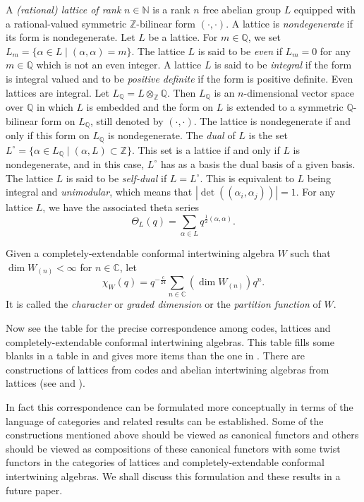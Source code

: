 \documentclass{amsproc}
\theoremstyle{definition}
\theoremstyle{remark}
\numberwithin{equation}{section}
\begin{document}
A {\it (rational) lattice of rank} $n\in \mathbb{N}$ is a rank $n$
free abelian group $L$ equipped with a rational-valued symmetric
$\mathbb{Z}$-bilinear form $(\cdot, \cdot)$. A lattice is {\it
nondegenerate} if its form is nondegenerate. 
Let $L$ be a lattice.  For $m\in
\mathbb{Q}$, we set $L_{m}=\{\alpha\in L\;|\;( \alpha, \alpha
)=m\}$. The lattice $L$ is said to be {\it even} if $L_{m}=0$ for any
$m\in \mathbb{Q}$ which is not an even integer. A lattice $L$ is said to be
{\it integral} if the form is integral valued and to be {\it positive
definite} if the form is positive definite. Even lattices are
integral. Let $L_{\mathbb{Q}} =L\otimes_{\mathbb{Z}} \mathbb{Q}$. Then
$L_{\mathbb{Q}}$ is an $n$-dimensional vector space over $\mathbb{Q}$
in which $L$ is embedded and the form on $L$ is extended to a
symmetric $\mathbb{Q}$-bilinear form on $L_{\mathbb{Q}}$, still denoted
by $(\cdot, \cdot)$. The lattice
is nondegenerate if and only if this form on $L_{\mathbb{Q}}$ is
nondegenerate.  The {\it dual} of $L$ is the set
$L^{\circ}=\{\alpha\in L_{\mathbb{Q}}\; |\;( \alpha, L)\subset
\mathbb{Z}\}$. This set is a lattice if and only if $L$ is nondegenerate,
and in this case, $L^{\circ}$ has as a basis the dual basis of a given
basis.  The lattice $L$ is said to be {\it
self-dual} if $L=L^{\circ}$. This is equivalent to $L$ being integral
and {\it unimodular}, which means that $|\det((\alpha_{i},
\alpha_{j}))|=1$.   For any lattice $L$, we have the
associated theta series
$$\Theta_{L}(q)=\sum_{\alpha\in L}q^{\frac{1}{2}(\alpha, \alpha)}.$$

Given a completely-extendable 
conformal 
intertwining algebra $W$ such that $\dim W_{(n)}<\infty$ 
for $n\in \mathbb{C}$, let 
$$\chi_{W}(q)=q^{-\frac{c}{24}}
\sum_{n\in \mathbb{C}}(\dim W_{(n)})q^{n}.$$
It is called the {\it character} or {\it graded dimension} or 
the {\it partition function} of $W$.



Now see the table for the precise correspondence among codes, lattices
and completely-extendable conformal intertwining algebras. This table
fills some blanks in a table 
in \cite{G} and gives more items than the one in
\cite{G}. There are constructions of lattices from codes and abelian
intertwining algebras from lattices (see \cite{CN} and
\cite{DL2}). 

In fact this correspondence can be formulated more conceptually in
terms of the language of categories and related results can be
established. Some of the constructions mentioned above should be
viewed as canonical functors and others should be viewed as
compositions of these canonical functors with some twist functors in
the categories of lattices and completely-extendable conformal
intertwining algebras. We shall discuss this formulation and these
results in a future paper.
\end{document}
